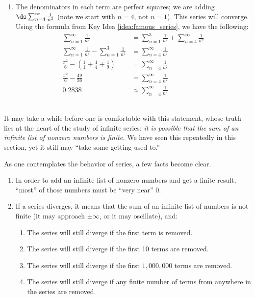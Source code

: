 {\begin{enumerate}
\item		The denominators in each term are perfect squares; we are adding $\ds \sum_{n=4}^\infty \frac{1}{n^2}$ (note  we start with $n=4$, not $n=1$). This series will converge. Using the formula from Key Idea \ref{idea:famous_series}, we have the following:
\begin{align*}
\sum_{n=1}^\infty \frac1{n^2} &= \sum_{n=1}^3 \frac1{n^2} +\sum_{n=4}^\infty \frac1{n^2} \\
\sum_{n=1}^\infty \frac1{n^2} - \sum_{n=1}^3 \frac1{n^2} &=\sum_{n=4}^\infty \frac1{n^2} \\
\frac{\pi^2}{6} - \left(\frac11+\frac14+\frac19\right) &= \sum_{n=4}^\infty \frac1{n^2} \\
\frac{\pi^2}{6} - \frac{49}{36} &= \sum_{n=4}^\infty \frac1{n^2} \\
0.2838&\approx \sum_{n=4}^\infty \frac1{n^2} 
\end{align*}
\end{enumerate}
\baselineskip
}\\

It may take a while before one is comfortable with this statement, whose truth lies at the heart of the study of infinite series: \emph{it is possible that the sum of an infinite list of nonzero numbers is finite.} We have seen this repeatedly in this section, yet it still may ``take some getting used to.''

As one contemplates the behavior of series, a few facts become clear. 
\begin{enumerate}
\item		In order to add an infinite list of nonzero numbers and get a finite result, ``most'' of those numbers must be ``very near'' 0. 
\item		If a series diverges, it means that the sum of an infinite list of numbers is not finite (it may approach $\pm \infty$, or it may oscillate), and:
		\begin{enumerate}
		\item		The series will still diverge if the first term is removed.
		\item		The series will still diverge if the first 10 terms are removed.
		\item		The series will still diverge if the first $1,000,000$ terms are removed.
		\item		The series will still diverge if any finite number of terms from anywhere in the series are removed.
		\end{enumerate}
\end{enumerate}

